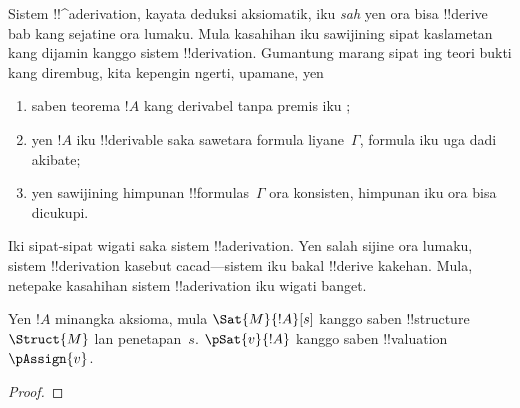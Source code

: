 \documentclass[../../../include/open-logic-section]{subfiles}
\begin{document}
      {}
      {}
      

\begin{explain}
Sistem !!^a{derivation}, kayata deduksi aksiomatik, iku \emph{sah} yen
ora bisa !!{derive} bab kang sejatine ora lumaku. Mula kasahihan iku
sawijining sipat kaslametan kang dijamin kanggo sistem
!!{derivation}. Gumantung marang sipat ing teori bukti kang dirembug,
kita kepengin ngerti, upamane, yen
\begin{enumerate}
\item saben teorema $!A$ kang derivabel tanpa premis iku ;
\item yen $!A$ iku !!{derivable} saka sawetara formula liyane~$\Gamma$,
  formula iku uga dadi akibate;
\item yen sawijining himpunan !!{formula}s~$\Gamma$ ora konsisten,
  himpunan iku ora bisa dicukupi.
\end{enumerate}
Iki sipat-sipat wigati saka sistem !!a{derivation}. Yen salah sijine
ora lumaku, sistem !!{derivation} kasebut cacad---sistem iku bakal
!!{derive} kakehan. Mula, netepake kasahihan sistem
!!a{derivation} iku wigati banget.
\end{explain}

\begin{prop}
  Yen $!A$ minangka aksioma, mula
    {$\Sat{M}{!A}[s]$ kanggo saben !!{structure}~$\Struct{M}$ lan penetapan~$s$.}
    {$\pSat{v}{!A}$ kanggo saben !!{valuation}~$\pAssign{v}$.}
\end{prop}

\begin{proof}
\end{proof}
\end{document}
